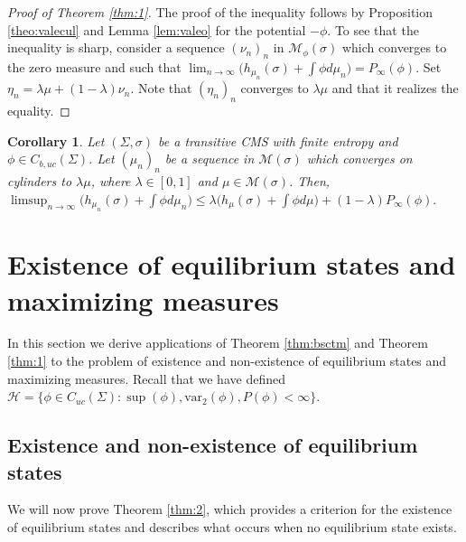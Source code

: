 \documentclass[letterpaper,11pt]{amsart}
\theoremstyle{plain}
\theoremstyle{plain}
\newtheorem{corollary}[proposition]{Corollary}
\theoremstyle{definition}
\theoremstyle{remark}
\def\M{{\mathcal M}}
\def\H{{\mathcal H}}
\begin{document}
\begin{proof}[Proof of Theorem \ref{thm:1}] The proof of the inequality follows by  Proposition \ref{theo:valecul} and Lemma \ref{lem:valeo} for the potential $-\phi$. To see that the inequality is sharp, consider a sequence $(\nu_n)_n$ in $\M_\phi(\sigma)$ which converges to the zero measure and such that $\lim_{n\to\infty}\big(h_{\mu_n}(\sigma)+\int \phi d\mu_n\big)=P_\infty(\phi)$. Set $\eta_n=\lambda \mu+(1-\lambda)\nu_n$. Note that $(\eta_n)_n$ converges to $\lambda\mu$ and that it realizes the equality.
\end{proof}

\begin{corollary}\label{cor:finent} Let $(\Sigma,\sigma)$ be a transitive CMS with finite entropy and $\phi\in C_{b,uc}(\Sigma)$.  Let $(\mu_n)_n$ be a sequence  in $\M(\sigma)$ which converges on cylinders to $\lambda\mu$, where $\lambda\in [0,1]$ and $\mu\in\M(\sigma)$. Then, $\limsup_{n\to\infty}\big(h_{\mu_n}(\sigma)+\int \phi d\mu_n\big)\le \lambda\big(h_\mu(\sigma)+\int \phi d\mu\big)+(1-\lambda)P_\infty(\phi).$
\end{corollary}






\section{Existence of equilibrium states and maximizing measures}\label{maxme}
In this section we derive applications of Theorem \ref{thm:bsctm} and Theorem \ref{thm:1} to the problem of existence and non-existence of equilibrium states and maximizing measures. Recall that we have defined $\H=\{\phi\in C_{uc}(\Sigma): \sup(\phi), \text{var}_2(\phi),P(\phi)<\infty\}$.

\subsection{Existence and non-existence of equilibrium states} We will now prove Theorem \ref{thm:2}, which provides a criterion for the existence of equilibrium states and describes what occurs when no equilibrium state exists. 
\end{document}
